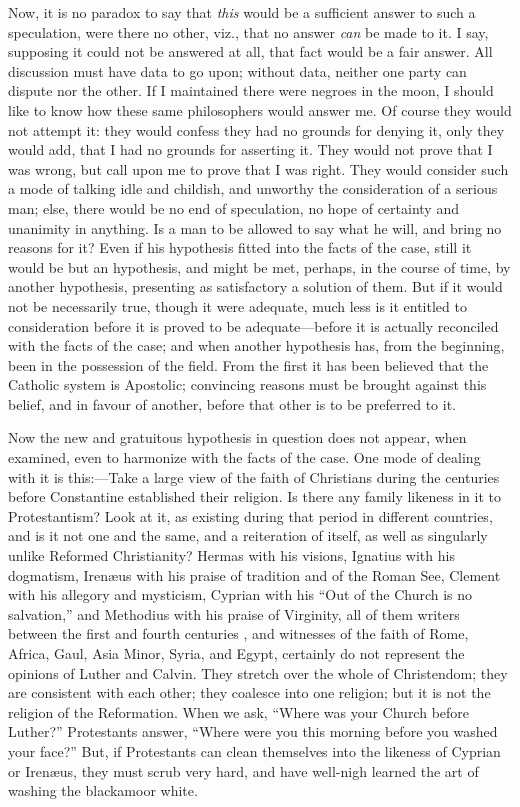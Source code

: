 Now, it is no paradox to say that \emph{this} would be a sufficient
answer to such a speculation, were there no other, viz., that no
answer \emph{can} be made to it. I say, supposing it could not be
answered at all, that fact would be a fair answer. All discussion must
have data to go upon; without data, neither one party can dispute nor
the other. If I maintained there were negroes in the moon, I should
like to know how these same philosophers would answer me. Of course
they would not attempt it: they would confess they had no grounds for
denying it, only they would add, that I had no grounds for asserting
it. They would not prove that I was wrong, but call upon me to
prove that I was right. They would consider such a mode of talking
idle and childish, and unworthy the consideration of a serious man;
else, there would be no end of speculation, no hope of certainty and
unanimity in anything. Is a man to be allowed to say what he will, and
bring no reasons for it? Even if his hypothesis fitted into the facts
of the case, still it would be but an hypothesis, and might be met,
perhaps, in the course of time, by another hypothesis, presenting as
satisfactory a solution of them. But if it would not be necessarily
true, though it were adequate, much less is it entitled to
consideration before it is proved to be adequate—before it is
actually reconciled with the facts of the case; and when another
hypothesis has, from the beginning, been in the possession of the
field. From the first it has been believed that the Catholic system is
Apostolic; convincing reasons must be brought against this belief, and
in favour of another, before that other is to be preferred to it.

Now the new and gratuitous hypothesis in question does not appear,
when examined, even to harmonize with the facts of the case. One mode
of dealing with it is this:—Take a large view of the faith of
Christians during the centuries before Constantine established their
religion. Is there any family likeness in it to Protestantism? Look at
it, as existing during that period in different countries, and is it
not one and the same, and a reiteration of itself, as well as
singularly unlike Reformed Christianity? Hermas with his visions,
Ignatius with his dogmatism, Irenæus with his praise of tradition and
of the Roman See, Clement with his allegory and mysticism, Cyprian
with his ``Out of the Church is no salvation,'' and Methodius
with his praise of Virginity, all of them writers between the first
and fourth centuries , and witnesses of the faith of Rome,
Africa, Gaul, Asia Minor, Syria, and Egypt, certainly do not represent
the opinions of Luther and Calvin. They stretch over the whole of
Christendom; they are consistent with each other; they coalesce into
one religion; but it is not the religion of the Reformation. When we
ask, ``Where was your Church before Luther?'' Protestants
answer, ``Where were you this morning before you washed your
face?'' But, if Protestants can clean themselves into the likeness
of Cyprian or Irenæus, they must scrub very hard, and have well-nigh
learned the art of washing the blackamoor white.

